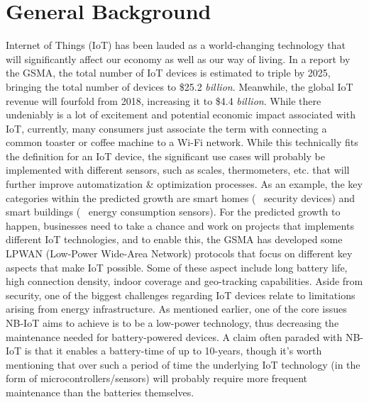 






\section{General Background}
Internet of Things (IoT) has been lauded as a world-changing technology that will significantly affect our economy as well as our way of living. In a report by the GSMA, the total number of IoT devices is estimated to triple by 2025, bringing the total number of devices to \$25.2 \textit{billion}. Meanwhile, the global IoT revenue will fourfold from 2018, increasing it to \$4.4 \textit{billion}.\cite{gsma-report} While there undeniably is a lot of excitement and potential economic impact associated with IoT, currently, many consumers just associate the term with connecting a common toaster or coffee machine to a Wi-Fi network. While this technically fits the definition for an IoT device\cite{what_is_iot}, the significant use cases will probably be implemented with different sensors, such as scales, thermometers, etc. that will further improve automatization \& optimization processes. As an example, the key categories within the predicted growth are smart homes (\eg~ security devices) and smart buildings (\eg~ energy consumption sensors).\cite{gsma-report} For the predicted growth to happen, businesses need to take a chance and work on projects that implements different IoT technologies, and to enable this, the GSMA has developed some LPWAN (Low-Power Wide-Area Network) protocols that focus on different key aspects that make IoT possible. Some of these aspect include long battery life, high connection density, indoor coverage and geo-tracking capabilities. Aside from security, one of the biggest challenges regarding IoT devices relate to limitations arising from energy infrastructure. As mentioned earlier, one of the core issues NB-IoT aims to achieve is to be a low-power technology, thus decreasing the maintenance needed for battery-powered devices. A claim often paraded with NB-IoT is that it enables a battery-time of up to 10-years\cite{gsma-nb-iot}, though it's worth mentioning that over such a period of time the underlying IoT technology (in the form of microcontrollers/sensors) will probably require more frequent maintenance than the batteries themselves.


